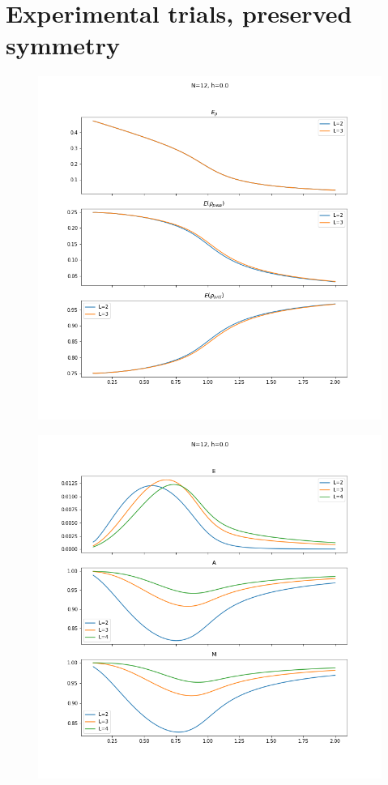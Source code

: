 \documentclass[12pt,a4paper]{article}
\begin{document}
	
	\clearpage
	\section{Experimental trials, preserved symmetry}

	\begin{figure}[h]
		\centering
		\includegraphics[width=\linewidth]{h0_rhos}
		\caption{}
		\label{fig:h0rhos}
	\end{figure}
	\begin{figure}[h]
		\centering
		\includegraphics[width=\linewidth]{h0_ergos}
		\caption{}
		\label{fig:h0ergos}
	\end{figure}
\end{document}
